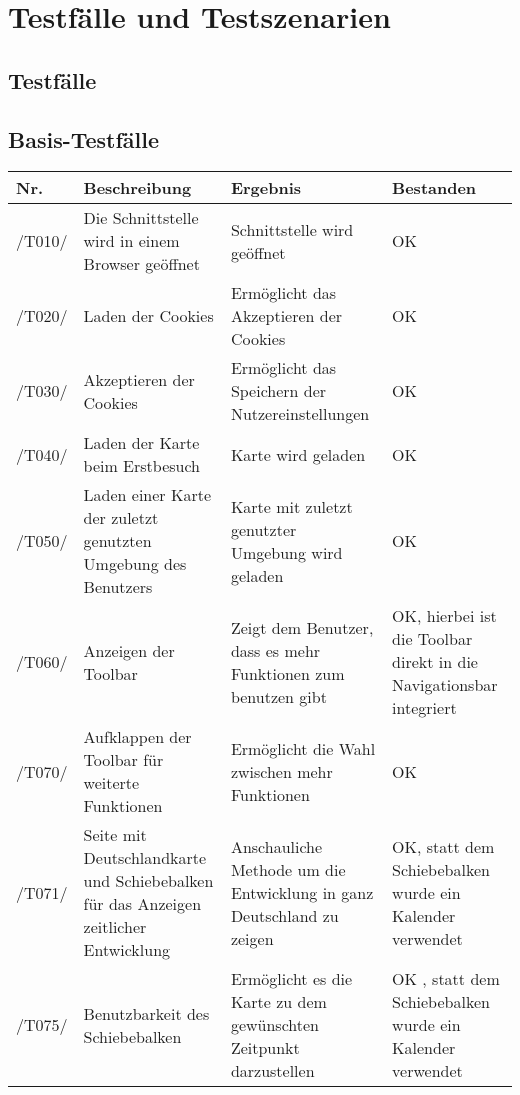 \section{Testfälle und Testszenarien}
\subsection{Testfälle}


\subsection{Basis-Testfälle}

\begin{tabularx}{\linewidth}{|s| m| m| m|}
	\hline
	\textbf{Nr.} & 
	\textbf{Beschreibung} &
	\textbf{Ergebnis} &
	\textbf{Bestanden}\\
	\hline
	/T010/ & Die Schnittstelle wird in einem Browser geöffnet & Schnittstelle wird geöffnet & OK \\
	\hline
	/T020/ & Laden der \glspl{Cookie} & Ermöglicht das Akzeptieren der \glspl{Cookie} & OK \\
	\hline
	/T030/ & Akzeptieren der \glspl{Cookie} & Ermöglicht das Speichern der Nutzereinstellungen & OK \\
	\hline
	/T040/ & Laden der Karte beim Erstbesuch & Karte wird geladen & OK \\
	\hline
	/T050/ & Laden einer Karte der zuletzt genutzten Umgebung des Benutzers & Karte mit zuletzt genutzter Umgebung wird geladen & OK \\
	\hline
	/T060/ & Anzeigen der \gls{Toolbar} & Zeigt dem Benutzer, dass es mehr Funktionen zum benutzen gibt & OK, hierbei ist die Toolbar direkt in die Navigationsbar integriert\\
	\hline
	/T070/ & Aufklappen der \gls{Toolbar} für weiterte Funktionen & Ermöglicht die Wahl zwischen mehr Funktionen & OK \\
	\hline
	/T071/ & Seite mit Deutschlandkarte und Schiebebalken für das Anzeigen zeitlicher Entwicklung & Anschauliche Methode um die Entwicklung in ganz Deutschland zu zeigen & OK, statt dem Schiebebalken wurde ein Kalender verwendet \\
	\hline
	/T075/ & Benutzbarkeit des Schiebebalken & Ermöglicht es die Karte zu dem gewünschten Zeitpunkt darzustellen & OK , statt dem Schiebebalken wurde ein Kalender verwendet \\

\end{tabularx}
